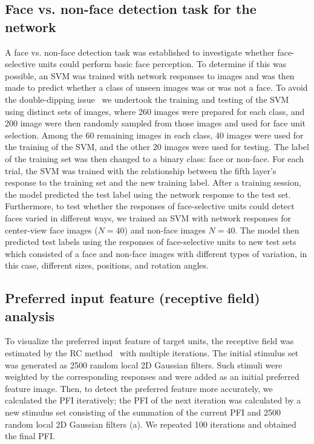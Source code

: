 \documentclass[sn-mathphys]{sn-jnl}%
\theoremstyle{thmstyleone}%
\theoremstyle{thmstyletwo}%
\theoremstyle{thmstylethree}%
\begin{document}
\subsection{Face vs. non-face detection task for the network}
A face vs. non-face detection task was established to investigate whether face-selective units could perform basic face perception.
To determine if this was possible, an SVM was trained with network responses to images and was then made to predict whether a class of unseen images was or was not a face.
To avoid the double-dipping issue~\cite{kriegeskorte2009circular} we undertook the training and testing of the SVM using distinct sets of images, 
where 260 images were prepared for each class, 
and 200 image were then randomly sampled from those images and used for face unit selection.
Among the 60 remaining images in each class, 40 images were used for the training of the SVM, 
and the other 20 images were used for testing.
The label of the training set was then changed to a binary class: face or non-face.
For each trial, the SVM was trained with the relationship between the fifth layer's response to the training set and the new training label.
After a training session, the model predicted the test label using the network response to the test set.
Furthermore, to test whether the responses of face-selective units could detect faces varied in different ways, 
we trained an SVM with network responses for center-view face images ($ N = 40 $) and non-face images $ N = 40 $.
The model then predicted test labels using the responses of face-selective units to new test sets which consisted of a face and non-face images with different types of variation, in this case, different sizes, positions, and rotation angles.


\subsection{Preferred input feature (receptive field) analysis} \label{sec:preferred}
To visualize the preferred input feature of target units, the receptive field was estimated by the RC method~\cite{bonin2011local} with multiple iterations.
The initial stimulus set was generated as 2500 random local 2D Gaussian filters.
Such stimuli were weighted by the corresponding responses and were added as an initial preferred feature image.
Then, to detect the preferred feature more accurately, we calculated the PFI iteratively;
the PFI of the next iteration was calculated by a new stimulus set consisting of the summation of the current PFI and 2500 random local 2D Gaussian filters (a).
We repeated 100 iterations and obtained the final PFI.
\end{document}
